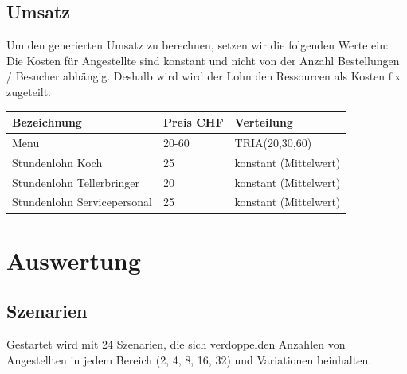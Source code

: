 \documentclass[ngerman,a4paper,12pt]{scrreprt}
\begin{document}
	\section{Umsatz}
\noindent
	Um den generierten Umsatz zu berechnen, setzen wir die folgenden Werte ein:
Die Kosten für Angestellte sind konstant und nicht von der Anzahl Bestellungen / Besucher abhängig. Deshalb wird wird der Lohn den Ressourcen als Kosten fix zugeteilt.\\

\begin{tabularx}{\textwidth}{|l|l|X|}
		\hline
		\textbf{Bezeichnung} & \textbf{Preis CHF} & \textbf{Verteilung}  \\
		\hline
		Menu & 20-60 & TRIA(20,30,60)  \\
		\hline
		Stundenlohn Koch & 25 & konstant (Mittelwert)\\
		Stundenlohn Tellerbringer & 20 & konstant (Mittelwert) \\
		Stundenlohn Servicepersonal & 25 & konstant (Mittelwert)\\
		\hline
\end{tabularx}
	
\chapter{Auswertung}
	\section{Szenarien}
			Gestartet wird mit 24 Szenarien, die sich verdoppelden Anzahlen von Angestellten in jedem Bereich (2, 4, 8, 16, 32) und Variationen beinhalten.
		
\end{document}

